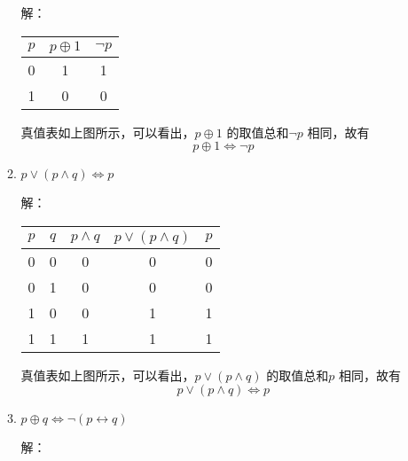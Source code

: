 \documentclass[UTF8]{ctexart}
\begin{document}
\begin{enumerate}
\begin{enumerate}
            解：
            \begin{table}[H]
                \centering
                \begin{tabular}{|ccc|}
                    \hline
                    $p$ & $p\oplus 1$ & $\neg p$ \\
                    \hline
                    0 & 1 & 1 \\ 
                    \hline
                    1 & 0 & 0 \\
                    \hline
                \end{tabular}
            \end{table}
            真值表如上图所示，可以看出，$p\oplus 1$
            的取值总和$\neg p$
            相同，故有
            \[
                p\oplus 1 \Leftrightarrow \neg p
            \]

            \item $p \vee (p\wedge q)\Leftrightarrow p$
            
            解：

            \begin{table}[H]
                \centering
                \begin{tabular}{|ccccc|}
                    \hline
                    $p$ & $q$ & $p\wedge q$ & $p\vee (p\wedge q)$ & $p$ \\
                    \hline
                    0 & 0 & 0 &0 & 0 \\ 
                    \hline
                    0 & 1 & 0 &0 & 0 \\
                    \hline
                    1 & 0 & 0 &1 & 1 \\
                    \hline
                    1 & 1 & 1 &1 & 1 \\
                    \hline
                \end{tabular}
            \end{table}
            真值表如上图所示，可以看出，$p\vee (p\wedge q)$
            的取值总和$p$
            相同，故有
            \[
                p \vee (p\wedge q)\Leftrightarrow p
            \]

            \item $p\oplus q \Leftrightarrow \neg(p\leftrightarrow q)$
            
            解：


\end{enumerate}
\end{enumerate}
\end{document}
